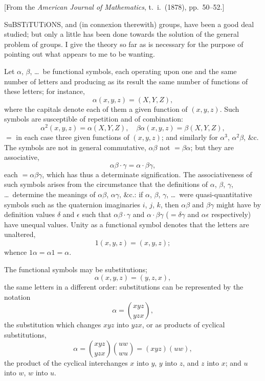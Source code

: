 \documentclass[11pt,a4paper]{book}
\begin{document}
[From the \textit{American Journal of Mathematics}, t.\ i.\ (1878), pp.\ 50--52.]

\medskip

SuBSTiTUTiONS, and (in connexion therewith) groups, have been a good deal studied; but only a little has been done towards the solution of the general problem of groups. I give the theory so far as is necessary for the purpose of pointing out what appears to me to be wanting.

Let $\alpha$, $\beta$, \dots\ be functional symbols, each operating upon one and the same number of letters and producing as its result the same number of functions of these letters; for instance,
\[
\alpha(x, y, z) = (X, Y, Z),
\]
where the capitals denote each of them a given function of $(x, y, z)$. Such symbols are susceptible of repetition and of combination:
\[
\alpha^2(x, y, z) = \alpha(X, Y, Z),
\quad
\beta\alpha(x, y, z) = \beta(X, Y, Z),
\]
$=$ in each case three given functions of $(x, y, z)$; and similarly for $\alpha^3$, $\alpha^2\beta$, \&c. The symbols are not in general commutative, $\alpha\beta$ not $= \beta\alpha$; but they are associative,
\[
\alpha\beta \cdot \gamma = \alpha \cdot \beta\gamma,
\]
each $= \alpha\beta\gamma$, which has thus a determinate signification. The associativeness of such symbols arises from the circumstance that the definitions of $\alpha$, $\beta$, $\gamma$, \dots\ determine the meanings of $\alpha\beta$, $\alpha\gamma$, \&c.: if $\alpha$, $\beta$, $\gamma$, \dots\ were quasi-quantitative symbols such as the quaternion imaginaries $i$, $j$, $k$, then $\alpha\beta$ and $\beta\gamma$ might have by definition values $\delta$ and $\epsilon$ such that $\alpha\beta \cdot \gamma$ and $\alpha \cdot \beta\gamma$ ($= \delta\gamma$ and $\alpha\epsilon$ respectively) have unequal values. Unity as a functional symbol denotes that the letters are unaltered,
\[
1(x, y, z) = (x, y, z);
\]
whence $1\alpha = \alpha 1 = \alpha$.

\clearpage
The functional symbols may be substitutions;
\[
\alpha(x, y, z) = (y, z, x),
\]
the same letters in a different order: substitutions can be represented by the notation
\[
\alpha = \binom{xyz}{yzx},
\]
the substitution which changes $xyz$ into $yzx$, or as products of cyclical substitutions,
\[
\alpha = \binom{xyz}{yzx}\binom{uw}{wu} = (xyz)(uw),
\]
the product of the cyclical interchanges $x$ into $y$, $y$ into $z$, and $z$ into $x$; and $u$ into $w$, $w$ into $u$.
\end{document}
